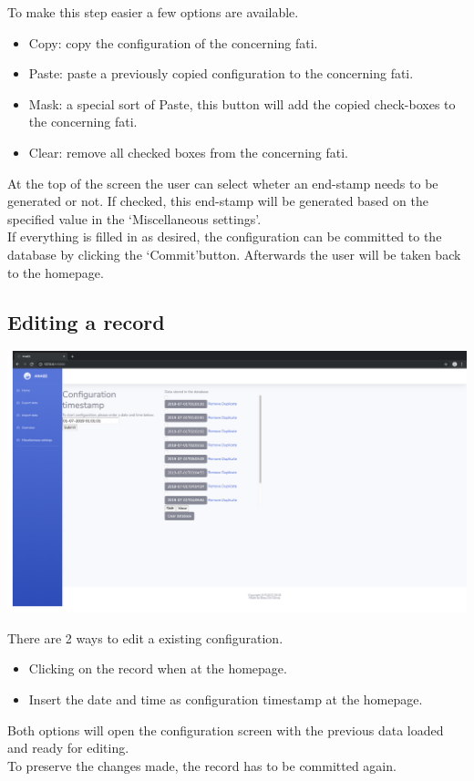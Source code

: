 \documentclass[12pt]{article}
\begin{document}
To make this step easier a few options are available.
\begin{itemize}
	\item Copy: copy the configuration of the concerning fati.
	\item Paste: paste a previously copied configuration to the concerning fati.
	\item Mask: a special sort of Paste, this button will add the copied check-boxes to the concerning fati.
	\item Clear: remove all checked boxes from the concerning fati.
\end{itemize}
At the top of the screen the user can select wheter an end-stamp needs to be generated or not. If checked, this end-stamp will be generated based on the specified value in the \lq Miscellaneous settings\rq.\\
If everything is filled in as desired, the configuration can be committed to the database by clicking the \lq Commit\rq button. Afterwards the user will be taken back to the homepage.

\subsection{Editing a record}
\begin{center}
	\includegraphics[width=\linewidth]{images/Edit_options.png}
\end{center}
There are 2 ways to edit a existing configuration.
\begin{itemize}
	\item Clicking on the record when at the homepage.
	\item Insert the date and time as configuration timestamp at the homepage.
\end{itemize}
Both options will open the configuration screen with the previous data loaded and ready for editing.\\
To preserve the changes made, the record has to be committed again.
\end{document}
